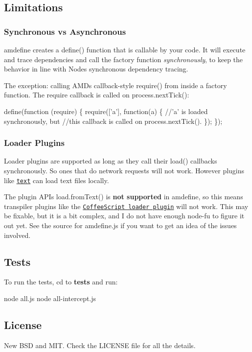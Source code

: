 \subsection*{Limitations}

\subsubsection*{Synchronous vs Asynchronous}

amdefine creates a define() function that is callable by your code. It will execute and trace dependencies and call the factory function {\itshape synchronously}, to keep the behavior in line with Node\textquotesingle{}s synchronous dependency tracing.

The exception\+: calling A\+MD\textquotesingle{}s callback-\/style require() from inside a factory function. The require callback is called on process.\+next\+Tick()\+:


\begin{DoxyCode}
define(function (require) \{
    require(['a'], function(a) \{
        //'a' is loaded synchronously, but
        //this callback is called on process.nextTick().
    \});
\});
\end{DoxyCode}


\subsubsection*{Loader Plugins}

Loader plugins are supported as long as they call their load() callbacks synchronously. So ones that do network requests will not work. However plugins like \href{http://requirejs.org/docs/api.html#text}{\tt text} can load text files locally.

The plugin A\+PI\textquotesingle{}s {\ttfamily load.\+from\+Text()} is {\bfseries not supported} in amdefine, so this means transpiler plugins like the \href{https://github.com/jrburke/require-cs}{\tt Coffee\+Script loader plugin} will not work. This may be fixable, but it is a bit complex, and I do not have enough node-\/fu to figure it out yet. See the source for amdefine.\+js if you want to get an idea of the issues involved.

\subsection*{Tests}

To run the tests, cd to {\bfseries tests} and run\+:


\begin{DoxyCode}
node all.js
node all-intercept.js
\end{DoxyCode}


\subsection*{License}

New B\+SD and M\+IT. Check the L\+I\+C\+E\+N\+SE file for all the details. 
